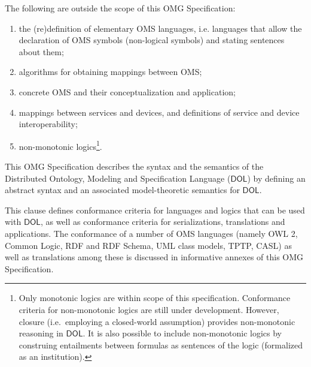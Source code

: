 \documentclass[10pt, a4paper]{isov2}
\makeatletter
\newcommand*{\ie}{i.e.\@\xspace}
\newcommand*\CommentAuthor{}
\renewcommand*\CommentAuthor{#1}}
\newcommand*\CommentDate{}
\renewcommand*\CommentDate{#1}}
\newcommand*\CommentId{}
\renewcommand*\CommentId{#1}}
\newcommand*\CommentType{}
\renewcommand*\CommentType{#1}}
\newcommand*{\SetCommentColorByType}[1]{%
\edef\localType{{#1}}%
\expandafter\ifstrequal\localType{q-aut}{\colorlet{CommentColor}{red}}{%
\expandafter\ifstrequal\localType{q-all}{\colorlet{CommentColor}{orange}}{%
\expandafter\ifstrequal\localType{todo}{\colorlet{CommentColor}{orange}}{%
\expandafter\ifstrequal\localType{fyi}{\colorlet{CommentColor}{lightgray}}{%
\colorlet{CommentColor}{yellow}}}}}}
\newcommand*{\SetCommentPrefixByType}[1]{%
\edef\localType{{#1}}%
\expandafter\@ifmtarg\localType{%
\edef\CommentPrefix{}%
}{%
\caseupper[q]{#1}%
\edef\CommentPrefix{\thestring: }%
}}
\newcommand*{\initComment}[1]{%
\setkeys{Comment}{#1}%
\SetCommentColorByType{\CommentType}%
\relax%
\SetCommentPrefixByType{\CommentType}%
\relax%
}
\newcommand*{\todonote}[2][]{%
\initComment{#1}%
\pdfcomment[author=\CommentAuthor,color=CommentColor,date=\CommentDate,id=\CommentId]{%
\CommentPrefix
#2}}
\renewcommand*{\todonote}[2][]{%
\initComment{#1}%
\ednote{\CommentPrefix #2}}
\newcommand*{\IS}{OMG Specification\xspace}
\newcommand*{\DOL}{\ensuremath{\mathsf{DOL}}\xspace}
\makeatother
\begin{document}
The following are outside the scope of this \IS:
 \begin{enumerate} 
\item the (re)definition of elementary OMS languages, \ie languages that allow the declaration of OMS symbols (non-logical symbols) 
and
stating sentences about them;
\item algorithms for obtaining mappings between OMS;
\item concrete OMS and their conceptualization and application;
\item mappings between services and devices, and definitions of service and device interoperability;
\item non-monotonic logics\footnote{Only monotonic logics are within scope of this specification. Conformance criteria for non-monotonic logics are still under development. However, closure (i.e.\ employing a closed-world assumption) provides non-monotonic reasoning in \DOL. It is also possible to include non-monotonic logics by construing entailments between formulas as sentences of the logic (formalized as an institution).}. 

 \end{enumerate} 

This \IS describes the syntax and the semantics of the Distributed Ontology, Modeling and
Specification Language (\DOL) by defining an abstract syntax and an associated model-theoretic
semantics for \DOL. 


\cleardoublepage
{}\label{c:conformance}
This clause defines conformance criteria for languages and logics that can be used with \DOL, as well as conformance criteria for
serializations, translations and applications. The conformance of a
number of OMS languages (namely OWL 2, Common Logic, RDF and RDF Schema, 
UML class models, TPTP, CASL) as well as translations among
these is discussed in informative annexes of this \IS.
\end{document}
